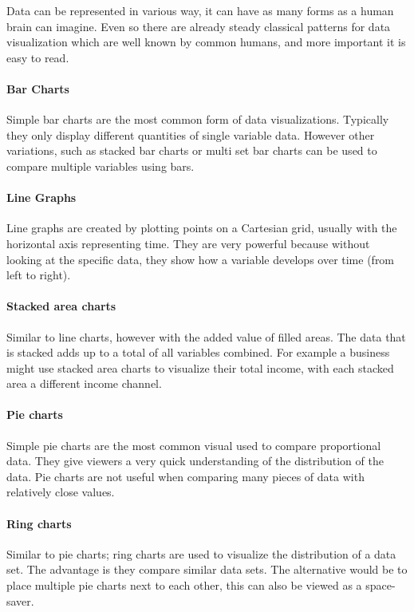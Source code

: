 Data can be represented in various way, it can have as many forms as a human brain can imagine. Even so there are already steady classical patterns for data visualization which are well known by common humans, and more important it is easy to read.

\paragraph{Bar Charts}
Simple bar charts are the most common form of data visualizations. Typically they only display different quantities of single variable data. However other variations, such as stacked bar charts or multi set bar charts can be used to compare multiple variables using bars.

\paragraph{Line Graphs}
Line graphs are created by plotting points on a Cartesian grid, usually with the horizontal axis representing time. They are very powerful because without looking at the specific data, they show how a variable develops over time (from left to right).

\paragraph{Stacked area charts}
Similar to line charts, however with the added value of filled areas. The data that is stacked adds up to a total of all variables combined. For example a business might use stacked area charts to visualize their total income, with each stacked area a different income channel.

\paragraph{Pie charts}
Simple pie charts are the most common visual used to compare proportional data. They give viewers a very quick understanding of the distribution of the data. Pie charts are not useful when comparing many pieces of data with relatively close values.

\paragraph{Ring charts}
Similar to pie charts; ring charts are used to visualize the distribution of a data set. The advantage is they compare similar data sets. The alternative would be to place multiple pie charts next to each other, this can also be viewed as a space-saver.

